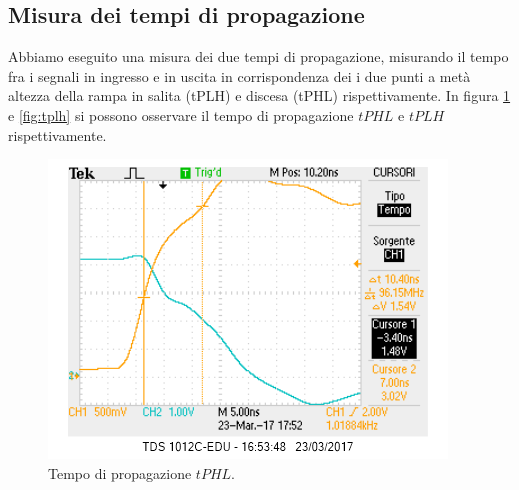 \documentclass[10pt,a4paper]{article}
\begin{document}
\subsection{Misura dei tempi di propagazione}
Abbiamo eseguito una misura dei due tempi di propagazione, misurando il tempo fra i segnali in ingresso e in uscita in corrispondenza dei i due punti a metà altezza della rampa in salita (tPLH) e discesa (tPHL) rispettivamente.
In figura \ref{fig:tphl} e \ref{fig:tplh} si possono osservare il tempo di propagazione $tPHL$ e $tPLH$ rispettivamente.
\begin{figure}[!htb]
\centering
\includegraphics[scale=0.6]{tphl(meglio).png}
\caption{Tempo di propagazione $tPHL$.\label{fig:tphl}}
\end{figure}
\end{document}
